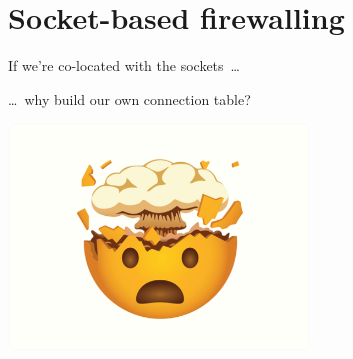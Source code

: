 \documentclass[black,white]{beamer}
\newcommand\blfootnote[1]{%
  \begingroup
  \renewcommand\thefootnote{}\footnote{#1}%
  \addtocounter{footnote}{-1}%
  \endgroup
}
\begin{document}

    \section{Socket-based firewalling}

    \begin{frame}{If we're co-located with the sockets~\ldots}
        \begin{flushright}
            \ldots~why build our own connection table? \medskip
        \end{flushright}
	\begin{center}
        \includegraphics[width=0.6\textwidth]{mindblown.png}
	\end{center}
    \end{frame}
\end{document}
